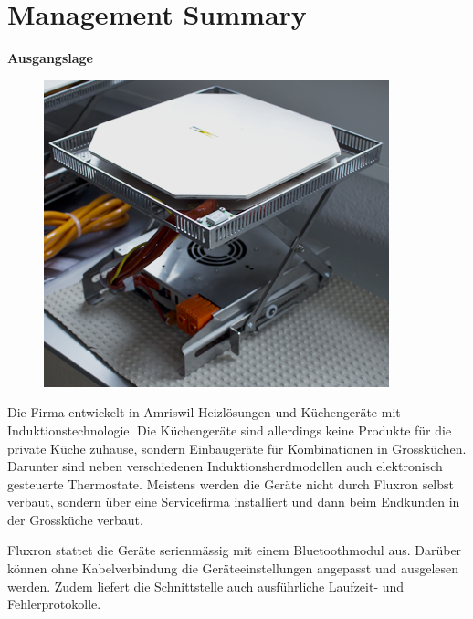 \chapter*{Management Summary}

\textbf{Ausgangslage}

\begin{figure}
	\vspace{-0.5cm}
	\begin{center}
		\includegraphics[scale=1]{start/img/img_7680}
	\end{center}
	\vspace{-0.5cm}
\end{figure}

Die Firma \fluxron{} entwickelt in Amriswil Heizlösungen und Küchengeräte mit Induktionstechnologie. Die Küchengeräte sind allerdings keine Produkte für die private Küche zuhause, sondern Einbaugeräte für Kombinationen in Grossküchen. Darunter sind neben verschiedenen Induktionsherdmodellen auch elektronisch gesteuerte Thermostate. Meistens werden die Geräte nicht durch Fluxron selbst verbaut, sondern über eine Servicefirma installiert und dann beim Endkunden in der Grossküche verbaut.

Fluxron stattet die Geräte serienmässig mit einem Bluetoothmodul aus. Darüber können ohne Kabelverbindung die Geräteeinstellungen angepasst und ausgelesen werden. Zudem liefert die Schnittstelle auch ausführliche Laufzeit- und Fehlerprotokolle.

